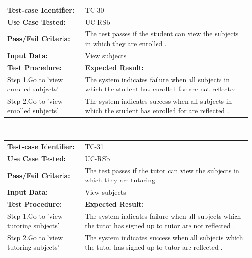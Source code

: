 \documentclass[12pt]{article}
\begin{document}
\begin{tabular}{| p{8cm} | p{8cm} |} \hline
	\textbf{Test-case Identifier:}& TC-30\\
	\textbf{Use Case Tested:}& UC-RSb\\
	\textbf{Pass/Fail Criteria:}& The test passes if the student can view the  subjects in which they are enrolled .\\
	\textbf{Input Data:}& View subjects\\\hline
	\textbf{Test Procedure:}& \textbf{Expected Result:} \\\hline
	Step 1.Go to 'view enrolled subjects' & The system indicates failure when all subjects in which the student has enrolled for are not reflected . \\
	Step 2.Go to 'view enrolled subjects' & The system indicates success when all subjects in which the student has enrolled for are  reflected . \\
		\hline
\end{tabular}
\\


\begin{tabular}{| p{8cm} | p{8cm} |} \hline
	\textbf{Test-case Identifier:}& TC-31\\
	\textbf{Use Case Tested:}& UC-RSb\\
	\textbf{Pass/Fail Criteria:}& The test passes if the tutor can view the  subjects in which they are tutoring .\\
	\textbf{Input Data:}& View subjects\\\hline
	\textbf{Test Procedure:}& \textbf{Expected Result:} \\\hline
	Step 1.Go to 'view tutoring subjects' & The system indicates failure when all subjects which the tutor has signed up to tutor  are not reflected . \\
	Step 2.Go to 'view tutoring subjects' & The system indicates success when all subjects which the tutor has signed up to tutor are reflected . \\
		\hline
\end{tabular}
\\
\end{document}
